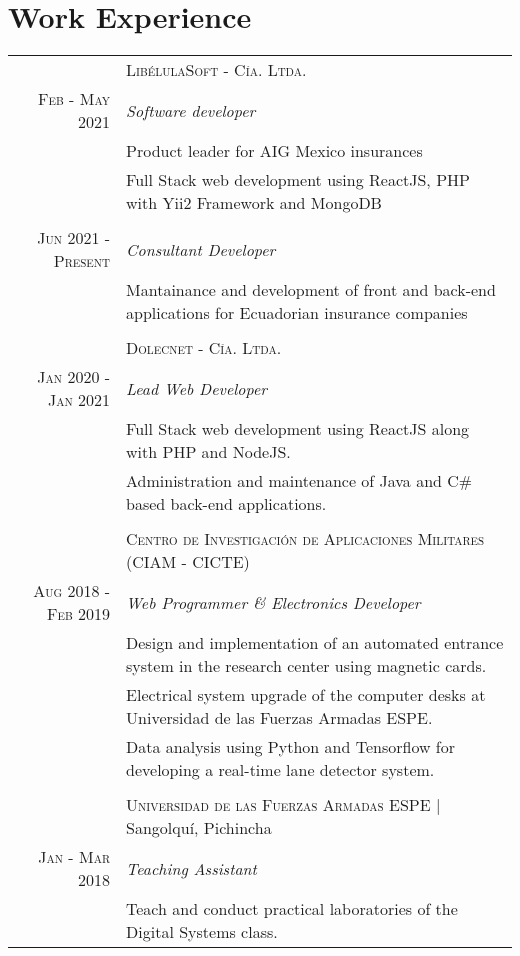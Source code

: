 \documentclass[a4paper,10.9pt]{article}
\begin{document}
\section{Work Experience}
\begin{tabular}{r|p{11cm}}
 &\textsc{LibélulaSoft - Cía. Ltda.} \\
\textsc{Feb - May 2021}&\emph{Software developer}\\
&\footnotesize{Product leader for AIG Mexico insurances}
\\
&\footnotesize{Full Stack web development using ReactJS, PHP with Yii2 Framework and MongoDB}\\
\\
\textsc{Jun 2021 - Present}&\emph{Consultant Developer}\\
&\footnotesize{Mantainance and development of front and back-end applications for Ecuadorian insurance companies}
\\
\\
 &\textsc{Dolecnet - Cía. Ltda.} \\
\textsc{Jan 2020 - Jan 2021} &\emph{Lead Web Developer}\\&\footnotesize{Full Stack web development using ReactJS along with PHP and NodeJS.}
\\&\footnotesize{Administration and maintenance of Java and C\# based back-end applications.}\\
\\
&\textsc{Centro de Investigación de Aplicaciones Militares (CIAM - CICTE)} \\
\textsc{Aug 2018 - Feb 2019}&\emph{Web Programmer \& Electronics Developer}\\&\footnotesize{Design and implementation of an automated entrance system in the research center using magnetic cards.}\\&\footnotesize{Electrical system upgrade of the computer desks at Universidad de las Fuerzas Armadas ESPE.}\\&\footnotesize{Data analysis using Python and Tensorflow for developing a real-time lane detector system.}\\
\\
 &\textsc{Universidad de las Fuerzas Armadas ESPE} | Sangolquí, Pichincha \\
 \textsc{Jan - Mar 2018}&\emph{Teaching Assistant}\\&\footnotesize{Teach and conduct practical laboratories of the Digital Systems class.}\\


\end{tabular}
\end{document}
